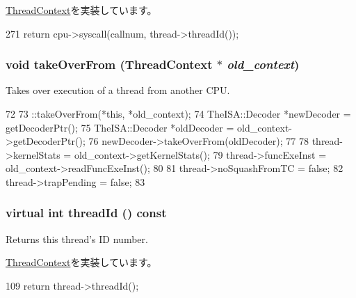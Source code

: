 \hyperlink{classThreadContext_ae5fdd7da5d82e981c65cbd6115dcfe60}{ThreadContext}を実装しています。


\begin{DoxyCode}
271     { return cpu->syscall(callnum, thread->threadId()); }
\end{DoxyCode}
\hypertarget{classO3ThreadContext_af121f4812cba8e37d675cddada8e47ed}{
\subsubsection[{takeOverFrom}]{\setlength{\rightskip}{0pt plus 5cm}void takeOverFrom ({\bf ThreadContext} $\ast$ {\em old\_\-context})}}
\label{classO3ThreadContext_af121f4812cba8e37d675cddada8e47ed}
Takes over execution of a thread from another CPU. 


\begin{DoxyCode}
72 {
73     ::takeOverFrom(*this, *old_context);
74     TheISA::Decoder *newDecoder = getDecoderPtr();
75     TheISA::Decoder *oldDecoder = old_context->getDecoderPtr();
76     newDecoder->takeOverFrom(oldDecoder);
77 
78     thread->kernelStats = old_context->getKernelStats();
79     thread->funcExeInst = old_context->readFuncExeInst();
80 
81     thread->noSquashFromTC = false;
82     thread->trapPending = false;
83 }
\end{DoxyCode}
\hypertarget{classO3ThreadContext_a4ea132a82460e5b862e551541cecde9e}{
\subsubsection[{threadId}]{\setlength{\rightskip}{0pt plus 5cm}virtual int threadId () const}}
\label{classO3ThreadContext_a4ea132a82460e5b862e551541cecde9e}
Returns this thread's ID number. 

\hyperlink{classThreadContext_a79882224329589b18076ee3f2f45d99f}{ThreadContext}を実装しています。


\begin{DoxyCode}
109 { return thread->threadId(); }
\end{DoxyCode}


